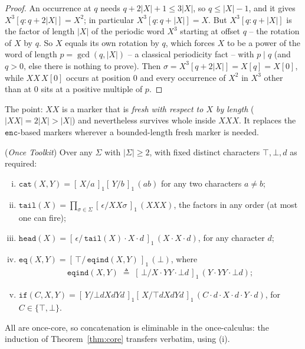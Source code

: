 \documentclass[runningheads,envcountsect]{llncs}
\begin{document}
\begin{proof}
    An occurrence at $q$ needs $q + 2|X| + 1 \leq 3|X|$, so $q \leq |X|-1$, and it gives $X^3[q{:}q+2|X|] = X^2$; in particular $X^3[q{:}q+|X|] = X$. But $X^3[q{:}q+|X|]$ is the factor of length $|X|$ of the periodic word $X^3$ starting at offset $q$ -- the rotation of $X$ by $q$. So $X$ equals its own rotation by $q$, which forces $X$ to be a power of the word of length $p = \gcd(q, |X|)$ -- a classical periodicity fact \cite{fine65,lothaire97} -- with $p \mid q$ (and $q > 0$, else there is nothing to prove). Then $\sigma = X^3[q+2|X|] = X[q] = X[0]$, while $XX\,X[0]$ occurs at position $0$ and every occurrence of $X^2$ in $X^3$ other than at $0$ sits at a positive multiple of $p$.
\end{proof}

The point: $XX$ is a marker that is \emph{fresh with respect to $X$ by length} ($|XX| = 2|X| > |X|$) and nevertheless survives whole inside $XXX$. It replaces the $\mathtt{enc}$-based markers wherever a bounded-length fresh marker is needed.

\begin{theorem}
    (\emph{Once Toolkit})
    \label{thm:once-toolkit}
    Over any $\Sigma$ with $|\Sigma| \geq 2$, with fixed distinct characters $\top, \bot, d$ as required:
    \begin{enumerate}[(i)]
        \item $\mathtt{cat}(X,Y) = [\,X/a\,]_1[\,Y/b\,]_1\,(ab)$ for any two characters $a \neq b$;
        \item $\mathtt{tail}(X) = \prod_{\sigma \in \Sigma} [\,\epsilon/XX\sigma\,]_1\,(XXX)$, the factors in any order (at most one can fire);
        \item $\mathtt{head}(X) = [\,\epsilon/\,\mathtt{tail}(X)\cdot X\cdot d\,]_1\,(X\cdot X\cdot d)$, for any character $d$;
        \item $\mathtt{eq}(X,Y) = [\,\top/\,\mathtt{eqind}(X,Y)\,]_1\,(\bot)$, where
        \begin{align}
            \mathtt{eqind}(X,Y) \;\triangleq\; [\,\bot/X\cdot YY\cdot\bot d\,]_1\,(Y\cdot YY\cdot\bot d);
        \end{align}
        \item $\mathtt{if}(C,X,Y) = [\,Y/\bot dXdYd\,]_1[\,X/\top dXdYd\,]_1\,(C\cdot d\cdot X\cdot d\cdot Y\cdot d)$, for $C \in \{\top,\bot\}$.
    \end{enumerate}
    All are once-core, so concatenation is eliminable in the once-calculus: the induction of Theorem~\ref{thm:core} transfers verbatim, using (i).
\end{theorem}
\end{document}
